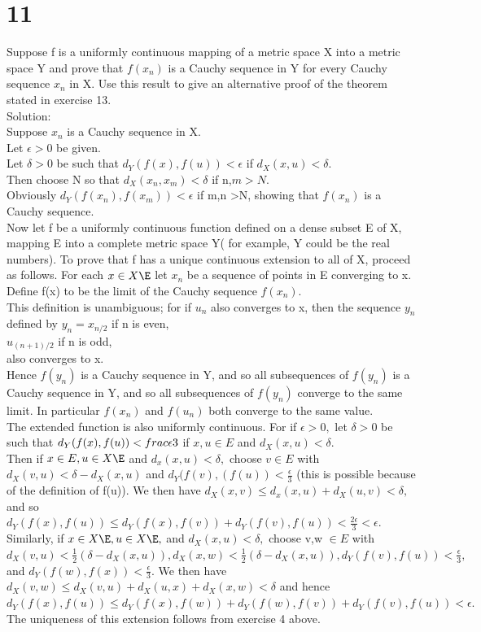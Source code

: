 \section*{11}
Suppose f is a uniformly continuous mapping of a metric space X into a metric space Y and prove that ${f(x_n)}$ is a Cauchy sequence in Y for every Cauchy sequence ${x_n}$ in X. Use this result to give an alternative proof of the theorem stated in exercise 13. \\ 
Solution: \\ 
Suppose ${x_n}$ is a Cauchy sequence in X. \\ 
Let $\epsilon >0$ be given. \\ 
Let $\delta >0$ be such that $d_Y(f(x),f(u))<\epsilon$ if $d_X(x,u)<\delta.$\\ 
Then choose N so that $d_X(x_n,x_m)< \delta$ if n,$m >N$. \\ 
Obviously $d_Y(f(x_n),f(x_m))<\epsilon$ if m,n >N, showing that ${f(x_n)}$ is a Cauchy sequence. \\ 
Now let f be a uniformly continuous function defined on a dense subset E of X, mapping E into a complete metric space Y( for example, Y could be the real numbers). To prove that f has a unique continuous extension to all of X, proceed as follows. For each $x \in X \E$ let ${x_n}$ be a sequence of points in E converging to x. \\ 
Define f(x) to be the limit of the Cauchy sequence ${f(x_n)}.$ \\ 
This definition is unambiguous; for if ${u_n}$ also converges to x, then the sequence ${y_n}$ defined by $y_n= x_{n/2}$ if n is even, \\ $u_{(n+1)/2}$ if n is odd, \\ 
also converges to x. \\ 
Hence ${f(y_n)}$ is a Cauchy sequence in Y, and so all subsequences of ${f(y_n)}$ is a Cauchy sequence in Y, and so all  subsequences of ${f(y_n)}$ converge to the same limit. In particular ${f(x_n)}$ and ${f(u_n)}$ both converge to the same value. \\ 
The extended function is also uniformly continuous. For if $ \epsilon >0,$ let $\delta >0$ be such that $d_Y(f(x),f(u))<\\frac{\epsilon}{3}$ if $x,u \in E$ and $d_X(x,u)<\delta.$ \\ 
Then if $x \in E, u \in X\E$ and $d_x(x,u)< \delta,$ choose $v \in E$ with $d_X(v,u)<\delta-d_X(x,u)$ and $d_Y(f(v),(f(u))< \frac{\epsilon}{3}$ (this is possible because of the definition of f(u)). We then have $d_X(x,v) \leq d_x(x,u)+d_X(u,v)< \delta,$ and so \\ 
$d_Y(f(x),f(u)) \leq d_Y(f(x),f(v))+d_Y(f(v),f(u))< \frac{2 \epsilon}{3}< \epsilon.$\\ 
Similarly, if $x \in X \E, u \in X\E,$ and $d_X(x,u)< \delta,$ choose v,w $\in E$ with $d_X(v,u)<\frac{1}{2}(\delta-d_X(x,u)),d_X(x,w)<\frac{1}{2}(\delta-d_X(x,u)),d_Y(f(v),f(u))<\frac{\epsilon}{3},$ and $d_Y(f(w),f(x))<\frac{\epsilon}{3}.$ We then have $d_X(v,w) \leq d_X(v,u)+d_X(u,x)+d_X(x,w)< \delta$ and hence $d_Y(f(x),f(u)) \leq d_Y(f(x),f(w))+d_Y(f(w),f(v))+d_Y(f(v),f(u))< \epsilon.$ \\ 
The uniqueness of this extension follows from exercise 4 above. 

